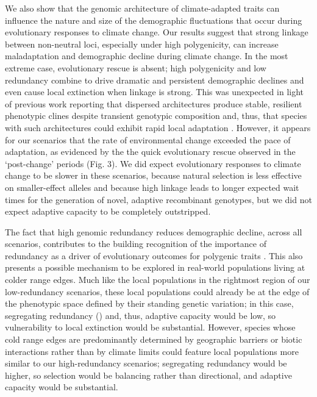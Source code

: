 \documentclass[9pt,twocolumn,twoside,lineno]{pnas-new}
\begin{document}
We also show that the genomic architecture of climate-adapted traits
can influence the nature and size of the demographic fluctuations
that occur during evolutionary responses to climate change.
Our results suggest that strong linkage between non-neutral loci,
especially under high polygenicity, can increase maladaptation and demographic decline
during climate change. 
In the most extreme case, evolutionary rescue is absent;
high polygenicity and low redundancy
combine to drive dramatic and persistent demographic declines
and even cause local extinction when linkage is strong.
This was unexpected in light of previous work reporting
that dispersed architectures produce stable,
resilient phenotypic clines despite transient genotypic composition \cite{yeaman_amnat,yeaman_review}
and, thus, that species with such architectures
could exhibit rapid local adaptation \cite{aitken_yeaman}. However, it appears for our scenarios that the rate of environmental change exceeded the pace of
adaptation, as evidenced by the the quick evolutionary
rescue observed in the  
`post-change' periods (Fig. 3). 
We did expect evolutionary responses to climate change
to be slower in these scenarios,
because natural selection is less effective on smaller-effect alleles
and because high linkage leads to longer expected wait times for the generation
of novel, adaptive recombinant genotypes, but we did not expect
adaptive capacity to be completely outstripped.

The fact that high genomic redundancy reduces demographic decline,
across all scenarios, contributes to the building recognition of the importance of redundancy
as a driver of evolutionary outcomes for polygenic traits
\cite{laruson,yeaman_review}.
This also presents a possible mechanism to be explored
in real-world populations living at colder range edges.
Much like the local populations in the rightmost region of our low-redundancy scenarios,
these local populations could already be at the edge of the phenotypic space defined by
their standing genetic variation;
in this case, 
segregating redundancy (\cite{laruson}) and, thus,
adaptive capacity would be low,
so vulnerability to local extinction would be substantial.
However, species whose cold range edges are predominantly determined by geographic barriers
or biotic interactions rather than by climate limits \cite{thomas}
could feature local populations more similar to our high-redundancy scenarios;
segregating redundancy would be higher,
so selection would be balancing rather than directional, and adaptive capacity would be substantial.
\end{document}
